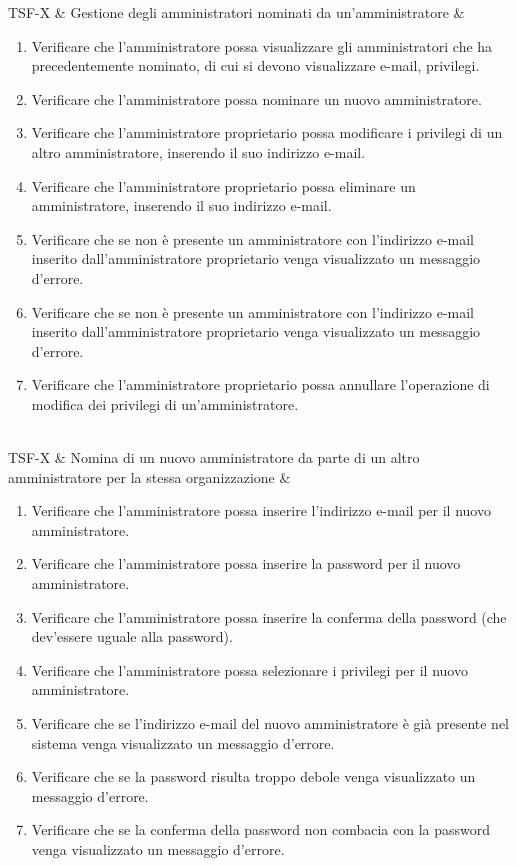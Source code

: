 TSF-X & Gestione degli amministratori nominati da un'amministratore & \begin{enumerate}
    \item Verificare che l'amministratore possa visualizzare gli amministratori che ha precedentemente nominato, di cui si devono visualizzare e-mail, privilegi.
    \item Verificare che l'amministratore possa nominare un nuovo amministratore.
    \item Verificare che l'amministratore proprietario possa modificare i privilegi di un altro amministratore, inserendo il suo indirizzo e-mail.
    \item Verificare che l'amministratore proprietario possa eliminare un amministratore, inserendo il suo indirizzo e-mail.
    \item Verificare che se non è presente un amministratore con l'indirizzo e-mail inserito dall'amministratore proprietario venga visualizzato un messaggio d'errore.
    \item Verificare che se non è presente un amministratore con l'indirizzo e-mail inserito dall'amministratore proprietario venga visualizzato un messaggio d'errore.
    \item Verificare che l'amministratore proprietario possa annullare l'operazione di modifica dei privilegi di un'amministratore.
\end{enumerate} \\

TSF-X & Nomina di un nuovo amministratore da parte di un altro amministratore per la stessa organizzazione & \begin{enumerate}
    \item Verificare che l'amministratore possa inserire l'indirizzo e-mail per il nuovo amministratore.
    \item Verificare che l'amministratore possa inserire la password per il nuovo amministratore.
    \item Verificare che l'amministratore possa inserire la conferma della password (che dev'essere uguale alla password).
    \item Verificare che l'amministratore possa selezionare i privilegi per il nuovo amministratore.
    \item Verificare che se l'indirizzo e-mail del nuovo amministratore è già presente nel sistema venga visualizzato un messaggio d'errore.
    \item Verificare che se la password risulta troppo debole venga visualizzato un messaggio d'errore.
    \item Verificare che se la conferma della password non combacia con la password venga visualizzato un messaggio d'errore.
\end{enumerate} \\

